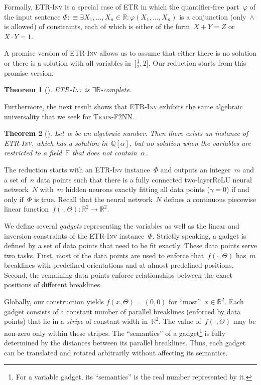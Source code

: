 \documentclass[11pt]{article}
\numberwithin{equation}{section}
\newtheorem{theorem}{Theorem}[section]
\theoremstyle{definition}
\theoremstyle{plain}
\newcommand{\R}{\mathbb R}
\newcommand{\Q}{\mathbb Q}
\newcommand{\F}{\ensuremath{\mathbb{F}}\xspace}
\newcommand{\ER}{\texorpdfstring{\ensuremath{\exists\R}}{ER}\xspace}
\newcommand{\problemname}[1]{\textnormal{\textsc{#1}}\xspace}
\newcommand{\ETR}{\problemname{ETR}}
\newcommand{\trainNN}{\problemname{Train-F2NN}}
\newcommand{\ETRINV}{\problemname{ETR-Inv}}
\newcommand{\fullyconnected}{fully connected\xspace}
\newcommand{\twolayer}{two-layer\xspace}
\newcommand{\ReLU}{\ensuremath{\mathrm{ReLU}}\xspace}
\newcommand{\CPWL}{continuous piecewise linear\xspace}
\newcommand{\dequiv}{:\equiv}
\theoremstyle{plain}
\begin{document}
Formally, \ETRINV is a special case of \ETR in which the quantifier-free part~$\varphi$ of the input sentence \(
    \Phi \dequiv
    \exists X_1, \ldots, X_n \in \R \colon
    \varphi(X_1, \ldots, X_n)
\) is a conjunction (only~$\land$ is allowed) of constraints, each of which is either of the form~$X + Y = Z$ or~$X \cdot Y = 1$.

A promise version of \ETRINV allows us to assume that
%
either there is no solution or there is a solution  %
with all variables in~$\bigl[\frac{1}{2},2\bigr]$.
%
%
%
%
Our reduction starts from this promise version.


\begin{theorem}[{\cite[Theorem 3.2]{Abrahamsen2022_ArtGallery}}]
    \label{thm:ETRINV}
    \ETRINV is \ER-complete.
\end{theorem}

Furthermore, 
the next result shows that %
\ETRINV exhibits the same algebraic universality that we seek
for \trainNN. %

\begin{theorem}[\cite{Abrahamsen2019_Toolbox}]
    \label{thm:ETRINV_universality}
    Let~$\alpha$ be an algebraic number.
    Then there exists an instance of \ETRINV, which has a solution in~$\Q[\alpha]$, but no solution when the variables are restricted to a field~$\F$ that does not contain~$\alpha$.
\end{theorem}

The reduction starts with an \ETRINV instance~$\Phi$ and outputs an integer~$m$ and a set of~$n$ data points such that there is a \fullyconnected \twolayer \ReLU neural network~$N$ with~$m$ hidden neurons exactly fitting all data points ($\gamma = 0$) if and only if~$\Phi$ is true.
Recall that the neural network~$N$ defines a \CPWL function~$f(\cdot, \Theta) \colon \R^2 \to \R^2$.

We define several \emph{gadgets} representing the variables as well as the linear and inversion constraints of the \ETRINV instance~$\Phi$.
Strictly speaking, a gadget is defined by a set of data points that need to be fit exactly.
These data points serve two tasks. %
%
%
First,  %
most of the data points are used to enforce that~$f(\cdot, \Theta)$ has~$m$ breaklines
with predefined orientations and at almost predefined positions.
%
Second,  %
the remaining data points enforce relationships between the exact positions of different
breaklines.

Globally, our construction yields $f(x, \Theta) = (0,0)$ for \enquote{most}~$x \in \R^2$.
Each gadget consists of a constant number of parallel breaklines (enforced by data points)
that lie in a \emph{stripe} of constant width in~$\R^2$.
The value of~$f(\cdot, \Theta)$ may be non-zero only within these stripes.
The \enquote{semantics} of a gadget\footnote{
For a variable gadget, its \enquote{semantics} is the real number represented by it.} 
is fully determined by the distances between its parallel breaklines.
Thus, each gadget can be translated and rotated arbitrarily without affecting its semantics.
\end{document}
